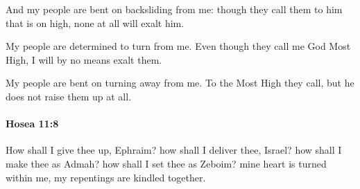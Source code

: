 			\begin{versebox}
					\item[BHS] 
					\item[LXX] 
					\item[ASV] And my people are bent on backsliding from me: though they call them to him that is on high, none at all will exalt him.
					\item[NIV] My people are determined to turn from me. Even though they call me God Most High, I will by no means exalt them.
					\item[NRSV] My people are bent on turning away from me. To the Most High they call, but he does not raise them up at all.
			\end{versebox}

		\paragraph{Hosea 11:8} %
			\label{HOSEA-11-8}

			How shall I give thee up, Ephraim? how shall I deliver thee, Israel? how shall I make thee as Admah? how shall I set thee as Zeboim? mine heart is turned within me, my repentings are kindled together.

